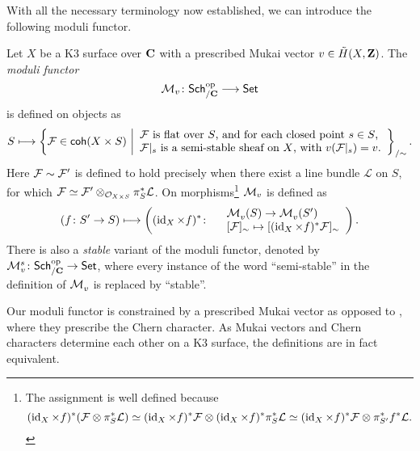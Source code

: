 \noindent
With all the necessary terminology now established, we can introduce the following moduli functor. 

\begin{definition}
    \label{Definition of moduli functor}
    Let $X$ be a K3 surface over $\mathbf C$ with a prescribed Mukai vector $v \in \,\tilde{\!{H}}(X, \mathbf Z)$. The \emph{moduli functor}
    \[
        \mathcal M_v \colon \mathsf{Sch}_{/\mathbf C}^{\text{op}} \longrightarrow \mathsf{Set}
    \]
    is defined on objects as 
    \[
        S \longmapsto \left\{\mathcal F \in \mathsf{coh}(X \times S) \ \middle| 
        \begin{array}{l}
            \text{$\mathcal F$ is flat over $S$, and for each closed point $s \in S$,} \\
            \text{$\mathcal F|_s$ is a semi-stable sheaf on $X$, with $v(\mathcal F|_s) = v$.}
        \end{array}
        \right\}_{/\sim}.
    \]
    Here $\mathcal F \sim \mathcal F'$ is defined to hold precisely when there exist a line bundle $\mathcal L$ on $S$, for which $\mathcal F \simeq \mathcal F' \otimes_{{\mathcal{O}_{X \times S}}} \pi_S^*\mathcal L$. On morphisms\footnote{
        The assignment is well defined because
        \[
            (\operatorname{id}_{X} \times f)^*(\mathcal F \otimes \pi_S^*\mathcal L) \simeq (\operatorname{id}_{X} \times f)^*\mathcal F \otimes (\operatorname{id}_{X} \times f)^*\pi_S^*\mathcal L \simeq (\operatorname{id}_{X} \times f)^*\mathcal F \otimes \pi_{S'}^*f^*\mathcal L.
        \]
    } $\mathcal M_v$ is defined as
    \[
        (f\colon S' \to S) \longmapsto \left( (\operatorname{id}_{X} \times f)^* \colon
            \begin{array}{r l}
                & \mathcal M^{}_v(S) \to \mathcal M^{}_v(S') \\
                & [\mathcal F]_\sim \mapsto [(\operatorname{id}_{X} \times f)^*\mathcal F]_\sim
            \end{array}
            \right).
    \]
    There is also a \emph{stable} variant of the moduli functor, denoted by $\mathcal M_v^{s} \colon \mathsf{Sch}_{/\mathbf C}^{\text{op}} \to \mathsf{Set}$, where every instance of the word ``semi-stable'' in the definition of $\mathcal M_v^{}$ is replaced by ``stable''.
\end{definition}

\begin{remark}
    Our moduli functor is constrained by a prescribed Mukai vector as opposed to \cite[\S 4.2, Proposition 4.15]{vanBree2020}, where they prescribe the Chern character.
    As Mukai vectors and Chern characters determine each other on a K3 surface, the definitions are in fact equivalent. 
\end{remark}

